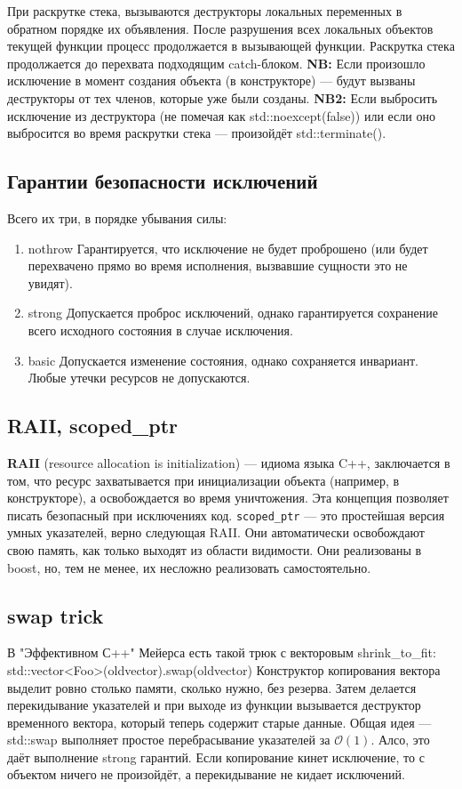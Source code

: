 \documentclass[15pt, a4paper]{article}
\newcommand{\nl}{\newline}
\begin{document}
При раскрутке стека, вызываются деструкторы локальных переменных в обратном порядке их объявления.
После разрушения всех локальных объектов текущей функции процесс продолжается в вызывающей функции. Раскрутка стека продолжается до перехвата подходящим catch-блоком. \nl
\textbf{NB:} Если произошло исключение в момент создания объекта (в конструкторе) --- будут вызваны деструкторы от тех членов, которые уже были созданы. \nl
\textbf{NB2:} Если выбросить исключение из деструктора (не помечая как std::noexcept(false)) или если оно выбросится во время раскрутки стека --- произойдёт std::terminate().
\subsection{Гарантии безопасности исключений}
Всего их три, в порядке убывания силы:
\begin{enumerate}
    \item nothrow \nl
    Гарантируется, что исключение не будет проброшено (или будет перехвачено прямо во время исполнения, вызвавшие сущности это не увидят).
    \item strong \nl
    Допускается проброс исключений, однако гарантируется сохранение всего исходного состояния в случае исключения.
    \item basic \nl
    Допускается изменение состояния, однако сохраняется инвариант. Любые утечки ресурсов не допускаются.
\end{enumerate}
\subsection{RAII, scoped\_ptr}
\textbf{RAII} (resource allocation is initialization) --- идиома языка C++, заключается в том, что ресурс захватывается при инициализации объекта (например, в конструкторе),
а освобождается во время уничтожения. Эта концепция позволяет писать безопасный при исключениях код. \nl
\texttt{scoped\_ptr} --- это простейшая версия умных указателей, верно следующая RAII. Они автоматически освобождают свою память, как только выходят из области видимости.
Они реализованы в boost, но, тем не менее, их несложно реализовать самостоятельно.
\subsection{swap trick}
В "Эффективном С++" Мейерса есть такой трюк с векторовым shrink\_to\_fit: \nl
{std::vector<Foo>(oldvector).swap(oldvector)} \nl
Конструктор копирования вектора выделит ровно столько памяти, сколько нужно, без резерва. Затем делается перекидывание указателей и при выходе из функции вызывается деструктор временного вектора, который теперь содержит старые данные.\nl
Общая идея --- std::swap выполняет простое перебрасывание указателей за $\mathcal{O}(1)$.
Алсо, это даёт выполнение strong гарантий. Если копирование кинет исключение, то с объектом ничего не произойдёт, а перекидывание не кидает исключений.
\end{document}
